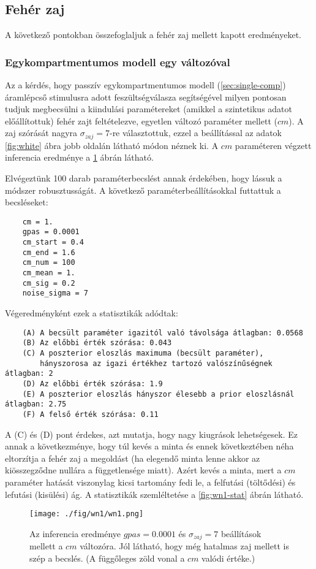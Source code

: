 \subsection{Fehér zaj}
A következő pontokban összefoglaljuk a fehér zaj mellett kapott eredményeket.
\subsubsection{Egykompartmentumos modell egy változóval}
Az a kérdés, hogy passzív egykompartmentumos modell (\ref{sec:single-comp}) áramlépcső stimulusra adott feszültségválasza segítségével milyen pontosan tudjuk megbecsülni a kiindulási paramétereket (amikkel a szintetikus adatot előállítottuk) fehér zajt feltételezve, egyetlen változó paraméter mellett ($cm$). A zaj szórását nagyra $\sigma_{zaj} = 7$-re választottuk, ezzel a beállítással az adatok \ref{fig:white} ábra jobb oldalán látható módon néznek ki. A $cm$ paraméteren végzett inferencia eredménye a \ref{fig:wn1} ábrán látható.

Elvégeztünk 100 darab paraméterbecslést annak érdekében, hogy lássuk a módszer robusztusságát. A következő paraméterbeállításokkal futtattuk a becsléseket:
\begin{verbatim}
	cm = 1.
	gpas = 0.0001
	cm_start = 0.4
	cm_end = 1.6
	cm_num = 100
	cm_mean = 1.
	cm_sig = 0.2
	noise_sigma = 7
\end{verbatim}
Végeredményként ezek a statisztikák adódtak:

\begin{verbatim}
	(A) A becsült paraméter igazitól való távolsága átlagban: 0.0568
	(B) Az előbbi érték szórása: 0.043
	(C) A poszterior eloszlás maximuma (becsült paraméter), 
	    hányszorosa az igazi értékhez tartozó valószínűségnek átlagban: 2
	(D) Az előbbi érték szórása: 1.9
	(E) A poszterior eloszlás hányszor élesebb a prior eloszlásnál átlagban: 2.75
	(F) A felső érték szórása: 0.11	
\end{verbatim}
A (C) és (D) pont érdekes, azt mutatja, hogy nagy kiugrások lehetségesek. Ez annak a következménye, hogy túl kevés a minta és ennek következtében néha eltorzítja a fehér zaj a megoldást (ha elegendő minta lenne akkor az kiösszegződne nullára a függetlensége miatt). Azért kevés a minta, mert a $cm$ paraméter hatását viszonylag kicsi tartomány fedi le, a felfutási (töltődési) és lefutási (kisülési) ág. A statisztikák szemléltetése a \ref{fig:wn1-stat} ábrán látható. 


\begin{figure}[!htb]
	\centering
	\texttt{[image: ./fig/wn1/wn1.png]}
	\caption[Egy kompartmentum, fehér zaj, egy paraméter eredmény]{Az inferencia eredménye $gpas = 0.0001$ és $\sigma_{zaj} = 7$ beállítások mellett a $cm$ változóra. Jól látható, hogy még hatalmas zaj mellett is szép a becslés. (A függőleges zöld vonal a $cm$ valódi értéke.)}
	\label{fig:wn1}
\end{figure}

